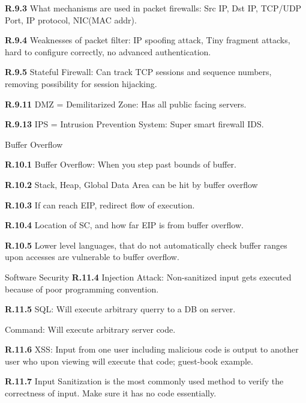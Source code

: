 \documentclass{report}
\begin{document}
{\bf R.9.3}
What mechanisms are used in packet firewalls: Src IP, Dst IP, TCP/UDP Port, IP
protocol, NIC(MAC addr).


{\bf R.9.4}
Weaknesses of packet filter: IP spoofing attack, Tiny fragment attacks, hard to
configure correctly, no advanced authentication.


{\bf R.9.5}
Stateful Firewall: Can track TCP sessions and sequence numbers, removing
possibility for session hijacking.

{\bf R.9.11}
DMZ = Demilitarized Zone: Has all public facing servers.

{\bf R.9.13}
IPS = Intrusion Prevention System: Super smart firewall IDS.



\large{Buffer Overflow}

{\bf R.10.1}
Buffer Overflow: When you step past bounds of buffer. 

{\bf R.10.2}
Stack, Heap, Global Data Area can be hit by buffer overflow

{\bf R.10.3}
If can reach EIP, redirect flow of execution.

{\bf R.10.4}
Location of SC, and how far EIP is from buffer overflow.

{\bf R.10.5}
Lower level languages, that do not automatically check buffer ranges upon
accesses are vulnerable to buffer overflow.







\large{Software Security}
{\bf R.11.4}
Injection Attack: Non-sanitized input gets executed because of poor programming
convention.

{\bf R.11.5}
SQL: Will execute arbitrary querry to a DB on server.

Command: Will execute arbitrary server code.

{\bf R.11.6}
XSS: Input from one user including malicious code is output to another user who
upon viewing will execute that code; guest-book example.

{\bf R.11.7}
Input Sanitization is the most commonly used method to verify the correctness of
input. Make sure it has no code essentially.
\end{document}
